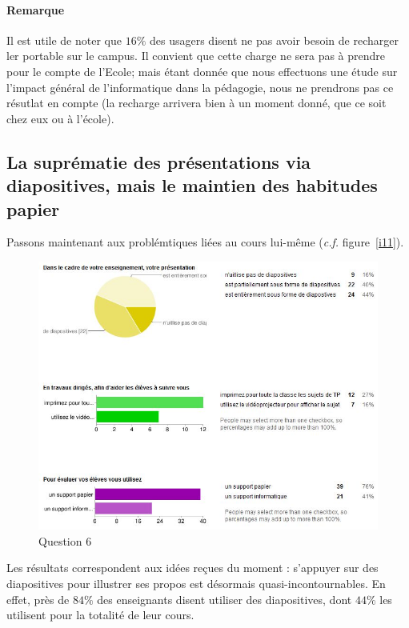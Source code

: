 \documentclass[a4paper,11pt,french]{article}
\begin{document}
\paragraph{Remarque}
Il est utile de noter que $16\%$ des usagers disent ne pas avoir besoin de recharger ler portable sur le campus. Il convient que cette charge ne sera pas à prendre pour le compte de l'Ecole; mais étant donnée que nous effectuons une étude sur l'impact général de l'informatique dans la pédagogie, nous ne prendrons pas ce résutlat en compte (la recharge arrivera bien à un moment donné, que ce soit chez eux ou à l'école).\\


\subsection[Quelles suprématies ?]{La suprématie des présentations via diapositives, mais le maintien des habitudes papier}

Passons maintenant aux problémtiques liées au cours lui-même (\textit{c.f.} figure~\vref{i11}).\\

\begin{figure}[h!]
\includegraphics[width=\textwidth]{i11.JPG}
\caption{Question 6}
\label{i11}
\end{figure}

Les résultats correspondent aux idées reçues du moment : s'appuyer sur des diapositives pour illustrer ses propos est désormais quasi-incontournables. En effet, près de $84\%$ des enseignants disent utiliser des diapositives, dont $44\%$ les utilisent pour la totalité de leur cours.\\
\end{document}
